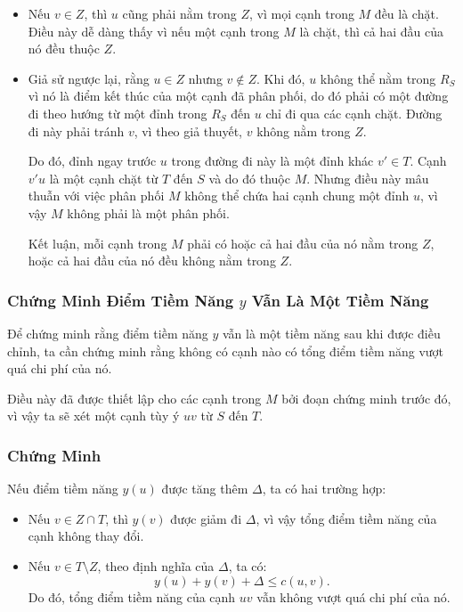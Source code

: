 \begin{itemize}
    \item Nếu \( v \in Z \), thì \( u \) cũng phải nằm trong \( Z \), vì mọi cạnh trong \( M \) đều là chặt. Điều này dễ dàng thấy vì nếu một cạnh trong \( M \) là chặt, thì cả hai đầu của nó đều thuộc \( Z \).

    \item Giả sử ngược lại, rằng \( u \in Z \) nhưng \( v \notin Z \). Khi đó, \( u \) không thể nằm trong \( R_S \) vì nó là điểm kết thúc của một cạnh đã phân phối, do đó phải có một đường đi theo hướng từ một đỉnh trong \( R_S \) đến \( u \) chỉ đi qua các cạnh chặt. Đường đi này phải tránh \( v \), vì theo giả thuyết, \( v \) không nằm trong \( Z \). 

    Do đó, đỉnh ngay trước \( u \) trong đường đi này là một đỉnh khác \( v' \in T \). Cạnh \( v'u \) là một cạnh chặt từ \( T \) đến \( S \) và do đó thuộc \( M \). Nhưng điều này mâu thuẫn với việc phân phối \( M \) không thể chứa hai cạnh chung một đỉnh \( u \), vì vậy \( M \) không phải là một phân phối. 

    Kết luận, mỗi cạnh trong \( M \) phải có hoặc cả hai đầu của nó nằm trong \( Z \), hoặc cả hai đầu của nó đều không nằm trong \( Z \).
\end{itemize}

\subsubsection{Chứng Minh Điểm Tiềm Năng \( y \) Vẫn Là Một Tiềm Năng}

Để chứng minh rằng điểm tiềm năng \( y \) vẫn là một tiềm năng sau khi được điều chỉnh, ta cần chứng minh rằng không có cạnh nào có tổng điểm tiềm năng vượt quá chi phí của nó. 

Điều này đã được thiết lập cho các cạnh trong \( M \) bởi đoạn chứng minh trước đó, vì vậy ta sẽ xét một cạnh tùy ý \( uv \) từ \( S \) đến \( T \). 

\subsubsection*{Chứng Minh}

Nếu điểm tiềm năng \( y(u) \) được tăng thêm \( \Delta \), ta có hai trường hợp:

\begin{itemize}
    \item Nếu \( v \in Z \cap T \), thì \( y(v) \) được giảm đi \( \Delta \), vì vậy tổng điểm tiềm năng của cạnh không thay đổi.
    
    \item Nếu \( v \in T \setminus Z \), theo định nghĩa của \( \Delta \), ta có:
    \[
    y(u) + y(v) + \Delta \leq c(u, v).
    \]
    Do đó, tổng điểm tiềm năng của cạnh \( uv \) vẫn không vượt quá chi phí của nó.
\end{itemize}

